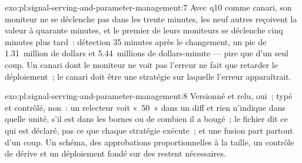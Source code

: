 \begin{solution}{exo:pl:signal-serving-and-parameter-management:7}
Avec q10 comme canari, son moniteur ne se déclenche pas dans les trente minutes, les neuf autres reçoivent la valeur à quarante minutes, et le premier de
leurs moniteurs se déclenche cinq minutes plus tard~: détection 35 minutes après le changement, un pic de 1.31~million de dollars et 5.44~millions de dollars-minute --- pire
que d'un seul coup. Un canari dont le moniteur ne voit pas l'erreur ne fait que retarder le déploiement~; le canari doit être une stratégie sur laquelle l'erreur
apparaîtrait.
\end{solution}

\begin{solution}{exo:pl:signal-serving-and-parameter-management:8}
Versionné et relu, oui~; typé et contrôlé, non~: un relecteur voit «~50~» dans un diff et rien n'indique dans quelle unité, s'il est dans les bornes ou
de combien il a bougé~; le fichier dit ce qui est déclaré, pas ce que chaque stratégie exécute~; et une fusion part partout d'un coup. Un schéma, des approbations
proportionnelles à la taille, un contrôle de dérive et un déploiement fondé sur des  restent nécessaires.
\end{solution}

